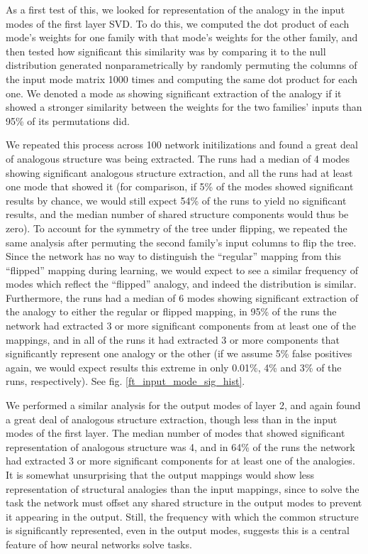 \documentclass[10pt,letterpaper]{article}
\begin{document}
As a first test of this, we looked for representation of the analogy in the input modes of the first layer SVD. To do this, we computed the dot product of each mode's weights for one family with that mode's weights for the other family, and then tested how significant this similarity was by comparing it to the null distribution generated nonparametrically by randomly permuting the columns of the input mode matrix 1000 times and computing the same dot product for each one. We denoted a mode as showing significant extraction of the analogy if it showed a stronger similarity between the weights for the two families' inputs than 95\% of its permutations did. \par
We repeated this process across 100 network initilizations and found a great deal of analogous structure was being extracted. The runs had a median of 4 modes showing significant analogous structure extraction, and all the runs had at least one mode that showed it (for comparison, if 5\% of the modes showed significant results by chance, we would still expect 54\% of the runs to yield no significant results, and the median number of shared structure components would thus be zero). To account for the symmetry of the tree under flipping, we repeated the same analysis after permuting the second family's input columns to flip the tree. Since the network has no way to distinguish the ``regular'' mapping from this ``flipped'' mapping during learning, we would expect to see a similar frequency of modes which reflect the ``flipped'' analogy, and indeed the distribution is similar. Furthermore, the runs had a median of 6 modes showing significant extraction of the analogy to either the regular or flipped mapping, in 95\% of the runs the network had extracted 3 or more significant components from at least one of the mappings, and in all of the runs it had extracted 3 or more components that significantly represent one analogy or the other (if we assume 5\% false positives again, we would expect results this extreme in only 0.01\%, 4\% and 3\% of the runs, respectively). See fig. \ref{ft_input_mode_sig_hist}. \par
We performed a similar analysis for the output modes of layer 2, and again found a great deal of analogous structure extraction, though less than in the input modes of the first layer. The median number of modes that showed significant representation of analogous structure was 4, and in 64\% of the runs the network had extracted 3 or more significant components for at least one of the analogies. It is somewhat unsurprising that the output mappings would show less representation of structural analogies than the input mappings, since to solve the task the network must offset any shared structure in the output modes to prevent it appearing in the output. Still, the frequency with which the common structure is significantly represented, even in the output modes, suggests this is a central feature of how neural networks solve tasks. \par  
\end{document}

